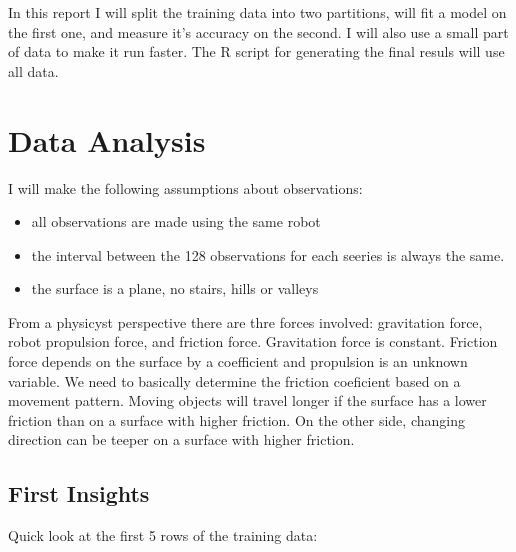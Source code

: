 \documentclass[]{article}
\providecommand{\tightlist}{%
  \setlength{\itemsep}{0pt}\setlength{\parskip}{0pt}}
\begin{document}
In this report I will split the training data into two partitions, will
fit a model on the first one, and measure it's accuracy on the second. I
will also use a small part of data to make it run faster. The R script
for generating the final resuls will use all data.

\hypertarget{data-analysis}{%
\section{Data Analysis}\label{data-analysis}}

I will make the following assumptions about observations:

\begin{itemize}
\tightlist
\item
  all observations are made using the same robot
\item
  the interval between the 128 observations for each seeries is always
  the same.
\item
  the surface is a plane, no stairs, hills or valleys
\end{itemize}

From a physicyst perspective there are thre forces involved: gravitation
force, robot propulsion force, and friction force. Gravitation force is
constant. Friction force depends on the surface by a coefficient and
propulsion is an unknown variable. We need to basically determine the
friction coeficient based on a movement pattern. Moving objects will
travel longer if the surface has a lower friction than on a surface with
higher friction. On the other side, changing direction can be teeper on
a surface with higher friction.

\hypertarget{first-insights}{%
\subsection{First Insights}\label{first-insights}}

Quick look at the first 5 rows of the training data:
\end{document}
